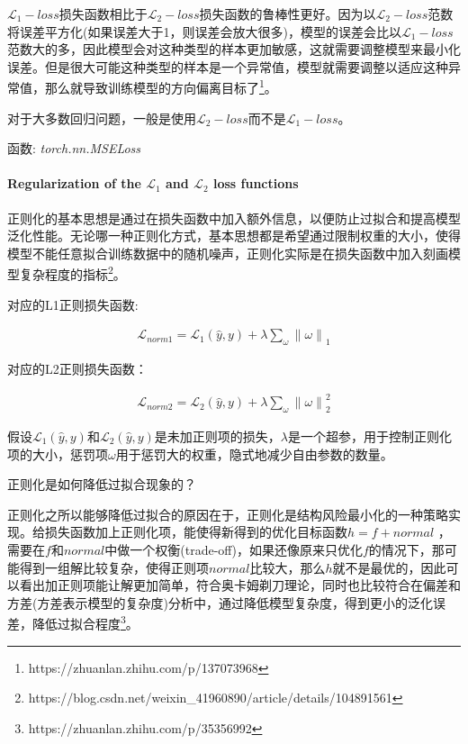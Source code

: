 \documentclass[letterpaper,12pt]{article}
\begin{document}
	$\mathcal{L}_1-loss$损失函数相比于$\mathcal{L}_2-loss$损失函数的鲁棒性更好。因为以$\mathcal{L}_2-loss$范数将误差平方化(如果误差大于1，则误差会放大很多)，模型的误差会比以$\mathcal{L}_1-loss$范数大的多，因此模型会对这种类型的样本更加敏感，这就需要调整模型来最小化误差。但是很大可能这种类型的样本是一个异常值，模型就需要调整以适应这种异常值，那么就导致训练模型的方向偏离目标了\footnote{https://zhuanlan.zhihu.com/p/137073968}。
	
	对于大多数回归问题，一般是使用$\mathcal{L}_2-loss$而不是$\mathcal{L}_1-loss$。
	
	函数: \textit{torch.nn.MSELoss}
	
	\paragraph{Regularization of the $\mathcal{L}_1$ and $\mathcal{L}_2$ loss functions}
	
	正则化的基本思想是通过在损失函数中加入额外信息，以便防止过拟合和提高模型泛化性能。无论哪一种正则化方式，基本思想都是希望通过限制权重的大小，使得模型不能任意拟合训练数据中的随机噪声，正则化实际是在损失函数中加入刻画模型复杂程度的指标\footnote{https://blog.csdn.net/weixin\_41960890/article/details/104891561}。
	
	对应的L1正则损失函数:
	
	\begin{equation}
		\begin{aligned}
			\mathcal{L}_{norm1} = \mathcal{L}_{1}{\left(\hat{y},y\right)} + \lambda \sum_{\omega}{\| \omega \|}_1
		\end{aligned}
	\end{equation}
	
	对应的L2正则损失函数：
	
	\begin{equation}
		\begin{aligned}
			\mathcal{L}_{norm2} = \mathcal{L}_{2}{\left(\hat{y},y\right)} + \lambda \sum_{\omega}{\| \omega \|}^2_2
		\end{aligned}
	\end{equation}
	
	假设$\mathcal{L}_{1}{\left(\hat{y},y\right)}$和$\mathcal{L}_{2}{\left(\hat{y},y\right)}$是未加正则项的损失，$\lambda$是一个超参，用于控制正则化项的大小，惩罚项$\omega$用于惩罚大的权重，隐式地减少自由参数的数量。
	
	正则化是如何降低过拟合现象的？
	
	正则化之所以能够降低过拟合的原因在于，正则化是结构风险最小化的一种策略实现。给损失函数加上正则化项，能使得新得到的优化目标函数$h = f + normal$ ，需要在$f$和$normal$中做一个权衡(trade-off)，如果还像原来只优化$f$的情况下，那可能得到一组解比较复杂，使得正则项$normal$比较大，那么$h$就不是最优的，因此可以看出加正则项能让解更加简单，符合奥卡姆剃刀理论，同时也比较符合在偏差和方差(方差表示模型的复杂度)分析中，通过降低模型复杂度，得到更小的泛化误差，降低过拟合程度\footnote{https://zhuanlan.zhihu.com/p/35356992}。
	
\end{document}
